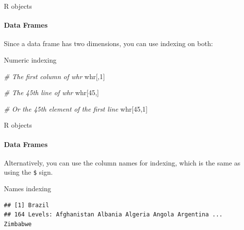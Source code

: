 \documentclass[ignorenonframetext,]{beamer}
\newenvironment{Shaded}{\begin{snugshade}}{\end{snugshade}}
\newcommand{\DecValTok}[1]{\textcolor[rgb]{0.00,0.00,0.81}{#1}}
\newcommand{\StringTok}[1]{\textcolor[rgb]{0.31,0.60,0.02}{#1}}
\newcommand{\CommentTok}[1]{\textcolor[rgb]{0.56,0.35,0.01}{\textit{#1}}}
\newcommand{\NormalTok}[1]{#1}
\begin{document}
\begin{frame}[fragile]{R objects}

\framesubtitle{Data Frames}

Since a data frame has two dimensions, you can use indexing on both:

\begin{block}{Numeric indexing}

\begin{Shaded}
\begin{Highlighting}[]
\CommentTok{# The first column of whr}
\NormalTok{whr[,}\DecValTok{1}\NormalTok{]}

\CommentTok{# The 45th line of whr}
\NormalTok{whr[}\DecValTok{45}\NormalTok{,]}

\CommentTok{# Or the 45th element of the first line}
\NormalTok{whr[}\DecValTok{45}\NormalTok{,}\DecValTok{1}\NormalTok{]}
\end{Highlighting}
\end{Shaded}

\end{block}

\end{frame}

\begin{frame}[fragile]{R objects}

\framesubtitle{Data Frames}

Alternatively, you can use the column names for indexing, which is the
same as using the \texttt{\$} sign.

\begin{block}{Names indexing}

\begin{Shaded}
\end{Shaded}

\begin{verbatim}
## [1] Brazil
## 164 Levels: Afghanistan Albania Algeria Angola Argentina ... Zimbabwe
\end{verbatim}

\end{block}

\end{frame}
\end{document}
